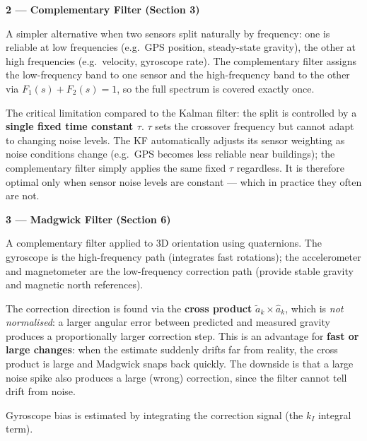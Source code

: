 \documentclass[12pt, a4paper]{article}
\begin{document}
\begin{keybox}
  \textbf{2 --- Complementary Filter (Section 3)}

  A simpler alternative when two sensors split naturally by frequency:
  one is reliable at low frequencies (e.g.\ GPS position, steady-state
  gravity), the other at high frequencies (e.g.\ velocity, gyroscope rate).
  The complementary filter assigns the low-frequency band to one sensor
  and the high-frequency band to the other via $F_1(s) + F_2(s) = 1$,
  so the full spectrum is covered exactly once.

  The critical limitation compared to the Kalman filter: the split is
  controlled by a \textbf{single fixed time constant $\tau$}.
  $\tau$ sets the crossover frequency but cannot adapt to changing noise
  levels.
  The KF automatically adjusts its sensor weighting as noise conditions
  change (e.g.\ GPS becomes less reliable near buildings); the
  complementary filter simply applies the same fixed $\tau$ regardless.
  It is therefore optimal only when sensor noise levels are constant ---
  which in practice they often are not.
\end{keybox}

\vspace{6pt}

\begin{keybox}
  \textbf{3 --- Madgwick Filter (Section 6)}

  A complementary filter applied to 3D orientation using quaternions.
  The gyroscope is the high-frequency path (integrates fast rotations);
  the accelerometer and magnetometer are the low-frequency correction path
  (provide stable gravity and magnetic north references).

  The correction direction is found via the \textbf{cross product}
  $\tilde{a}_k \times \hat{a}_k$, which is \emph{not normalised}:
  a larger angular error between predicted and measured gravity produces a
  proportionally larger correction step.
  This is an advantage for \textbf{fast or large changes}: when the
  estimate suddenly drifts far from reality, the cross product is large
  and Madgwick snaps back quickly.
  The downside is that a large noise spike also produces a large (wrong)
  correction, since the filter cannot tell drift from noise.

  Gyroscope bias is estimated by integrating the correction signal
  (the $k_I$ integral term).
\end{keybox}

\vspace{6pt}
\end{document}
